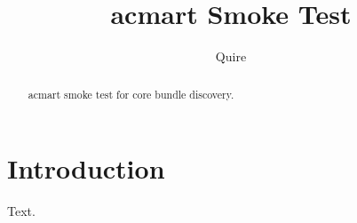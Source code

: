 \documentclass[sigconf]{acmart}
\begin{document}
\title{acmart Smoke Test}
\author{Quire}
\begin{abstract}
acmart smoke test for core bundle discovery.
\end{abstract}
\maketitle
\section{Introduction}
Text.
\end{document}
